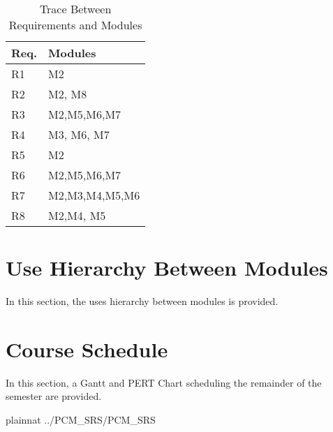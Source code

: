 \documentclass[12pt]{article}
\begin{document}
\begin{table}[H]
\centering
\begin{tabular}{p{} p{}}
\toprule
\textbf{Req.} & \textbf{Modules}\\
\midrule
R1 & M2\\
R2 & M2, M8\\
R3 & M2,M5,M6,M7\\
R4 & M3, M6, M7\\
R5 & M2\\
R6 & M2,M5,M6,M7\\
R7 & M2,M3,M4,M5,M6\\
R8 & M2,M4, M5\\
\bottomrule
\end{tabular}
\caption{Trace Between Requirements and Modules}
\label{TblRT}
\end{table}


\section{Use Hierarchy Between Modules} \label{SecUse}

In this section, the uses hierarchy between modules is
provided.



\section{Course Schedule} 

In this section, a Gantt and PERT Chart scheduling the remainder of the semester are provided.





 {plainnat}
 {../PCM_SRS/PCM_SRS}
\end{document}

